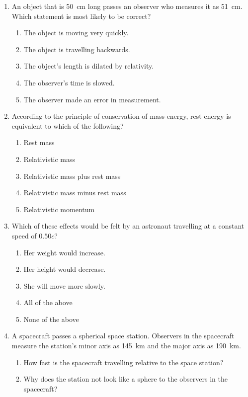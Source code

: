 \begin{enumerate}[itemsep=6pt]
\item An object that is \SI{50}{\centi\metre} long passes an observer who
  measures it as \SI{51}{\centi\metre}. Which statement is most likely to be
  correct?
  \begin{enumerate}
  \item The object is moving very quickly.
  \item The object is travelling backwards.
  \item The object's length is dilated by relativity.
  \item The observer's time is slowed.
  \item The observer made an error in measurement.
  \end{enumerate}

\item According to the principle of conservation of mass-energy, rest
  energy is equivalent to which of the following?
  \begin{enumerate}
  \item Rest mass
  \item Relativistic mass
  \item Relativistic mass plus rest mass
  \item Relativistic mass minus rest mass
  \item Relativistic momentum
  \end{enumerate}
  
\item Which of these effects would be felt by an astronaut travelling at a
  constant speed of $0.50c$?
  \begin{enumerate}
  \item Her weight would increase.
  \item Her height would decrease.
  \item She will move more slowly.
  \item All of the above
  \item None of the above
  \end{enumerate}
  
\item A spacecraft passes a spherical space station. Observers in the
  spacecraft measure the station's minor axis as \SI{145}{\kilo\metre} and the
  major axis as \SI{190}{\kilo\metre}.
  \begin{enumerate}[itemsep=3pt]
  \item How fast is the spacecraft travelling relative to the space station?
  \item Why does the station not look like a sphere to the observers in the
    spacecraft?
  \end{enumerate}
    

\end{enumerate}

